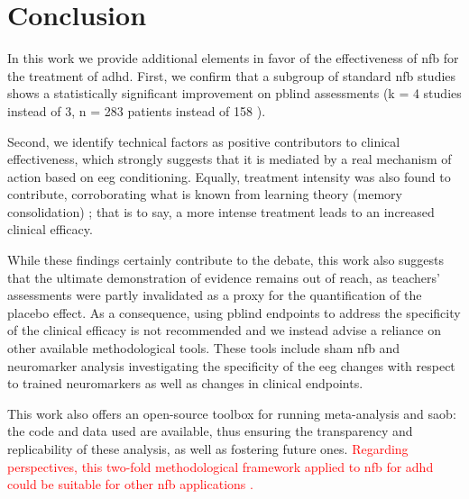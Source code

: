 

\section{Conclusion}

In this work we provide additional elements in favor of the effectiveness of \gls{nfb} for the treatment of \gls{adhd}. First, 
we confirm that a subgroup of standard \gls{nfb} studies shows a statistically significant improvement on \gls{pblind} 
assessments (k = 4 studies instead of 3, n = 283 patients instead of 158 \citet{Cortese2016}). 

Second, we identify technical factors as positive contributors to clinical effectiveness, which strongly suggests 
that it is mediated by a real mechanism of action based on \gls{eeg} conditioning. Equally, treatment intensity was also found to 
contribute, corroborating what is known from learning theory (memory consolidation) \citep{Mowrer1960}; that is to say, 
a more intense treatment leads to an increased clinical efficacy.

While these findings certainly contribute to the debate, this work also suggests that the ultimate demonstration of evidence 
remains out of reach, as teachers’ assessments were partly invalidated as a proxy for the quantification of the placebo effect. 
As a consequence, using \gls{pblind} endpoints to address the specificity of the clinical efficacy is not recommended 
and we instead advise a reliance on other available methodological tools. These tools include sham \gls{nfb} and neuromarker 
analysis investigating the specificity of the \gls{eeg} changes with respect to trained neuromarkers as well as changes 
in clinical endpoints.

This work also offers an open-source toolbox for running meta-analysis and \gls{saob}: the code and data used are available, 
thus ensuring the transparency and replicability of these analysis, as well as fostering future ones.
\textcolor{red}{Regarding perspectives, this two-fold methodological framework applied to \gls{nfb} for \gls{adhd} could be suitable for other \gls{nfb} applications \citep{Marzbani2016}.} 

